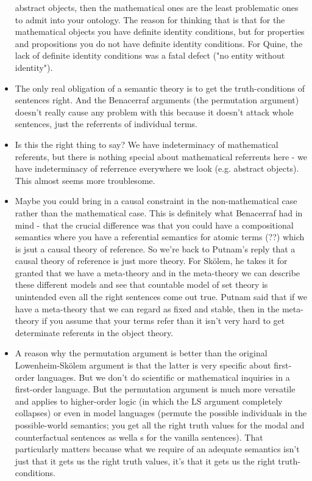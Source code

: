 \documentclass[12pt]{article}
\theoremstyle{definition}
\begin{document}
\begin{itemize}
        abstract objects, then the mathematical ones are the least problematic
        ones to admit into your ontology.  The reason for thinking that is that
        for the mathematical objects you have definite identity conditions, but
        for properties and propositions you do not have definite identity
        conditions. For Quine, the lack of definite identity conditions was a
        fatal defect ("no entity without identity").
    \item
        The only real obligation of a semantic theory is to get the
        truth-conditions of sentences right. And the Benacerraf arguments (the
        permutation argument) doesn't really cause any problem with this
        because it doesn't attack whole sentences, just the referrents of
        individual terms.
    \item
        Is this the right thing to say? We have indeterminacy of mathematical
        referents, but there is nothing special about mathematical referrents
        here - we have indeterminacy of referrence everywhere we look (e.g.
        abstract objects). This almost seems more troublesome.
    \item
        Maybe you could bring in a causal constraint in the non-mathematical
        case rather than the mathematical case. This is definitely what
        Benacerraf had in mind - that the crucial difference was that you could
        have a compositional semantics where you have a referential semantics
        for atomic terms (??) which is jsut a causal theory of reference. So
        we're back to Putnam's reply that a causal theory of reference is just
        more theory. For Sk\"olem, he takes it for granted that we have a
        meta-theory and in the meta-theory we can describe these different
        models and see that countable model of set theory is unintended even
        all the right sentences come out true. Putnam said that if we have a
        meta-theory that we can regard as fixed and stable, then in the
        meta-theory if you assume that your terms refer than it isn't very hard
        to get determinate referents in the object theory.
    \item
        A reason why the permutation argument is better than the original
        Lowenheim-Sk\"olem argument is that the latter is very specific about
        first-order languages. But we don't do scientific or mathematical
        inquiries in a first-order language. But the permutation argument is
        much more versatile and applies to higher-order logic (in which the LS
        argument completely collapses) or even in model languages (permute the
        possible individuals in the possible-world semantics; you get all the
        right truth values for the modal and counterfactual sentences as wella
        s for the vanilla sentences). That particularly matters because what we
        require of an adequate semantics isn't just that it gets us the right
        truth values, it's that it gets us the right truth-conditions.

\end{itemize}
\end{document}
